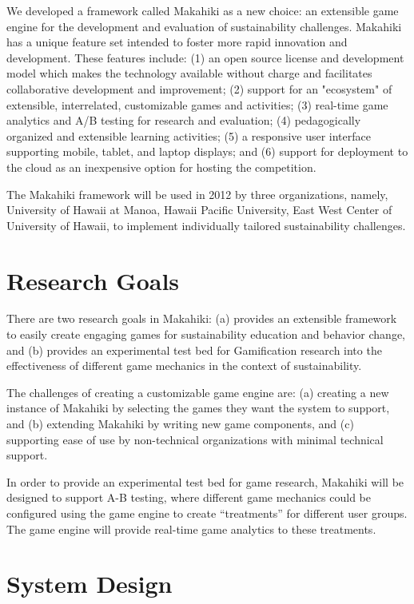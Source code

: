 \documentclass[11pt]{article}
\begin{document}
We developed a framework called Makahiki as a new choice: an extensible game engine for the development and evaluation of sustainability challenges. Makahiki has a unique feature set intended to foster more rapid innovation and development. These features include: (1) an open source license and development model which makes the technology available without charge and facilitates collaborative development and improvement; (2) support for an "ecosystem" of extensible, interrelated, customizable games and activities; (3) real-time game analytics and A/B testing for research and evaluation; (4) pedagogically organized and extensible learning activities; (5) a responsive user interface supporting mobile, tablet, and laptop displays; and (6) support for deployment to the cloud as an inexpensive option for hosting the competition.

The Makahiki framework will be used in 2012 by three organizations, namely, University of Hawaii at Manoa, Hawaii Pacific University, East West Center of University of Hawaii, to implement individually tailored sustainability challenges. 

\section{Research Goals}

There are two research goals in Makahiki: (a) provides an extensible framework to easily create engaging games for sustainability education and behavior change, and (b) provides an experimental test bed for Gamification research into the effectiveness of different game mechanics in the context of sustainability.

The challenges of creating a customizable game engine are:  (a) creating a new instance of Makahiki by selecting the games they want the system to support, and (b) extending Makahiki by writing new game components, and (c) supporting ease of use by non-technical organizations with minimal technical support.

In order to provide an experimental test bed for game research, Makahiki will be designed to support A-B testing, where different game mechanics could be configured using the game engine to create ``treatments'' for different user groups. The game engine will provide real-time game analytics to these treatments.

\section{System Design}
\end{document}
